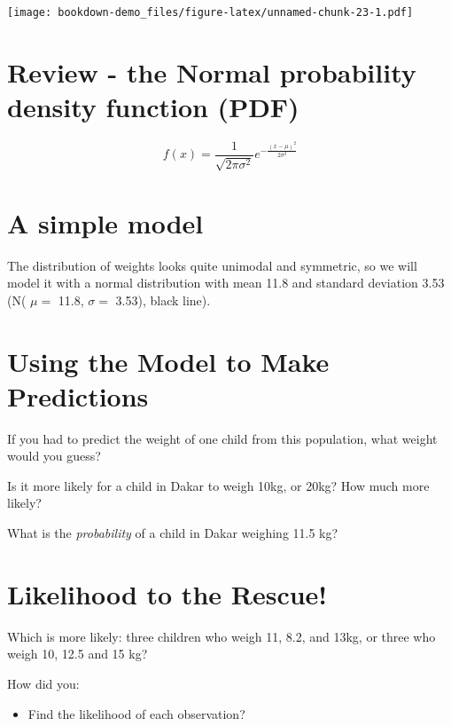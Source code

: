 \documentclass[]{book}
\providecommand{\tightlist}{%
  \setlength{\itemsep}{0pt}\setlength{\parskip}{0pt}}
\begin{document}
\texttt{[image: bookdown-demo\_files/figure-latex/unnamed-chunk-23-1.pdf]}

\hypertarget{review---the-normal-probability-density-function-pdf}{%
\section{Review - the Normal probability density function (PDF)}\label{review---the-normal-probability-density-function-pdf}}

\[ f(x) = \frac{1}{\sqrt{2\pi\sigma^2}} e^{-\frac{(x-\mu)^2}{2\sigma^2}} \]

\hypertarget{a-simple-model}{%
\section{A simple model}\label{a-simple-model}}

The distribution of weights looks quite unimodal and symmetric, so we will model it with a normal distribution with mean 11.8 and standard deviation 3.53 (N( \(\mu=\) 11.8, \(\sigma=\) 3.53), black line).

\hypertarget{using-the-model-to-make-predictions}{%
\section{Using the Model to Make Predictions}\label{using-the-model-to-make-predictions}}

If you had to predict the weight of one child from this population, what weight would you guess?
\vspace{0.05in}

Is it more likely for a child in Dakar to weigh 10kg, or 20kg? How much more likely?

What is the \emph{probability} of a child in Dakar weighing 11.5 kg?

\hypertarget{likelihood-to-the-rescue}{%
\section{Likelihood to the Rescue!}\label{likelihood-to-the-rescue}}

Which is more likely: three children who weigh 11, 8.2, and 13kg, or three who weigh 10, 12.5 and 15 kg?

How did you:

\begin{itemize}
\tightlist
\item
  Find the likelihood of each observation?
\end{itemize}
\end{document}
